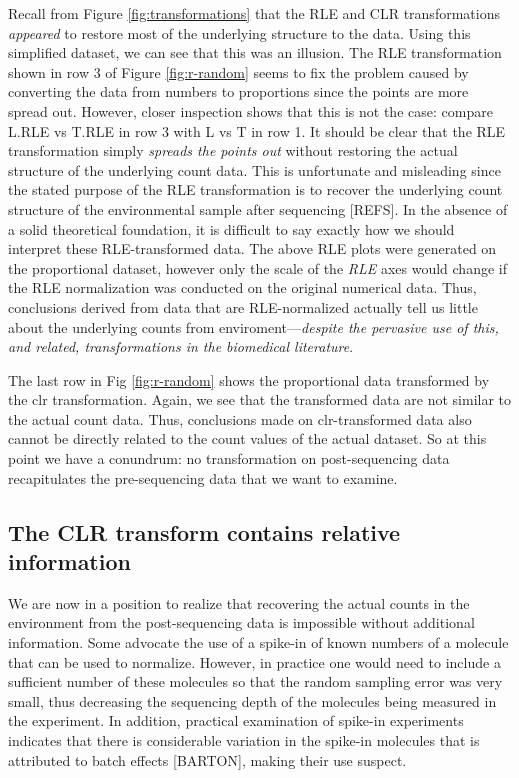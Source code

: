 \documentclass[onecolumn]{article}
\begin{document}
Recall from Figure \ref{fig:transformations} that the RLE and CLR transformations \emph{appeared} to restore most of the underlying structure to the data. Using this simplified dataset, we can see that this was an illusion. The RLE transformation shown in row 3 of Figure \ref{fig:r-random} seems to fix the problem caused by converting the data from numbers to proportions since the points are more spread out. However, closer inspection shows that this is not the case: compare L.RLE vs T.RLE in row 3 with L vs T in row 1. It should be clear that the RLE transformation simply \emph{spreads the points out} without restoring the actual structure of the underlying count data. This is unfortunate and misleading since the stated purpose of the RLE transformation is to recover the underlying count structure of the environmental sample after sequencing {[}REFS{]}. In the absence of a solid theoretical foundation, it is difficult to say exactly how we should interpret these RLE-transformed data. The above RLE plots were generated on the proportional dataset, however only the scale of the \emph{RLE} axes would change if the RLE normalization was conducted on the original numerical data. Thus, conclusions derived from data that are RLE-normalized actually tell us little about the underlying counts from enviroment---\emph{despite the pervasive use of this, and related, transformations in the biomedical literature}.

The last row in Fig \ref{fig:r-random} shows the proportional data transformed by the clr transformation. Again, we see that the transformed data are not similar to the actual count data. Thus, conclusions made on clr-transformed data also cannot be directly related to the count values of the actual dataset. So at this point we have a conundrum: no transformation on post-sequencing data recapitulates the pre-sequencing data that we want to examine.

\hypertarget{the-clr-transform-contains-relative-information}{%
\subsection{The CLR transform contains relative information}\label{the-clr-transform-contains-relative-information}}

We are now in a position to realize that recovering the actual counts in the environment from the post-sequencing data is impossible without additional information. Some advocate the use of a spike-in of known numbers of a molecule that can be used to normalize. However, in practice one would need to include a sufficient number of these molecules so that the random sampling error was very small, thus decreasing the sequencing depth of the molecules being measured in the experiment. In addition, practical examination of spike-in experiments indicates that there is considerable variation in the spike-in molecules that is attributed to batch effects {[}BARTON{]}, making their use suspect.
\end{document}
